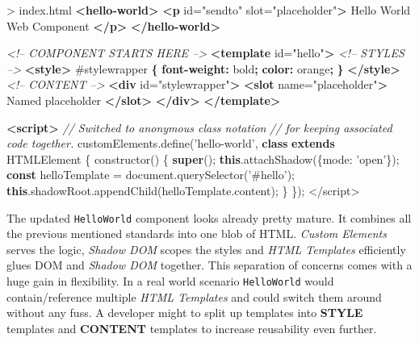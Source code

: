 \documentclass[]{article}
\newenvironment{Shaded}{}{}
\newcommand{\KeywordTok}[1]{\textcolor[rgb]{0.00,0.44,0.13}{\textbf{{#1}}}}
\newcommand{\DataTypeTok}[1]{\textcolor[rgb]{0.56,0.13,0.00}{{#1}}}
\newcommand{\FloatTok}[1]{\textcolor[rgb]{0.25,0.63,0.44}{{#1}}}
\newcommand{\StringTok}[1]{\textcolor[rgb]{0.25,0.44,0.63}{{#1}}}
\newcommand{\SpecialStringTok}[1]{\textcolor[rgb]{0.73,0.40,0.53}{{#1}}}
\newcommand{\CommentTok}[1]{\textcolor[rgb]{0.38,0.63,0.69}{\textit{{#1}}}}
\newcommand{\OtherTok}[1]{\textcolor[rgb]{0.00,0.44,0.13}{{#1}}}
\newcommand{\VariableTok}[1]{\textcolor[rgb]{0.10,0.09,0.49}{{#1}}}
\newcommand{\OperatorTok}[1]{\textcolor[rgb]{0.40,0.40,0.40}{{#1}}}
\newcommand{\AttributeTok}[1]{\textcolor[rgb]{0.49,0.56,0.16}{{#1}}}
\newcommand{\NormalTok}[1]{{#1}}
\begin{document}
\begin{Shaded}
\begin{Highlighting}[]
\NormalTok{> index.html}
\KeywordTok{<hello-world>}
 \KeywordTok{<p}\OtherTok{ id=}\StringTok{"sendto"}\OtherTok{ slot=}\StringTok{"placeholder"}\KeywordTok{>}
  \NormalTok{Hello World Web Component  }
 \KeywordTok{</p>}
\KeywordTok{</hello-world>}

\CommentTok{<!-- COMPONENT STARTS HERE -->}
\KeywordTok{<template}\OtherTok{ id=}\StringTok{"hello"}\KeywordTok{>}
 \CommentTok{<!-- STYLES -->}
 \KeywordTok{<style>}
  \FloatTok{#stylewrapper} \KeywordTok{\{}
   \KeywordTok{font-weight:} \DataTypeTok{bold}\KeywordTok{;}
   \KeywordTok{color:} \NormalTok{orange}\KeywordTok{;}
  \KeywordTok{\}}
 \KeywordTok{</style>}
 \CommentTok{<!-- CONTENT -->}
 \KeywordTok{<div}\OtherTok{ id=}\StringTok{"stylewrapper"}\KeywordTok{>}
  \KeywordTok{<slot}\OtherTok{ name=}\StringTok{"placeholder"}\KeywordTok{>}
   \NormalTok{Named placeholder}
  \KeywordTok{</slot>}
 \KeywordTok{</div>}
\KeywordTok{</template>}

\KeywordTok{<script>}
 \CommentTok{// Switched to anonymous class notation}
 \CommentTok{// for keeping associated code together.}
 \VariableTok{customElements}\NormalTok{.}\AttributeTok{define}\NormalTok{(}\StringTok{'hello-world'}\OperatorTok{,}
  \KeywordTok{class} \KeywordTok{extends} \NormalTok{HTMLElement }\OperatorTok{\{}
   \AttributeTok{constructor}\NormalTok{() }\OperatorTok{\{}
    \KeywordTok{super}\NormalTok{()}\OperatorTok{;}
    \KeywordTok{this}\NormalTok{.}\AttributeTok{attachShadow}\NormalTok{(}\OperatorTok{\{}\DataTypeTok{mode}\OperatorTok{:} \StringTok{'open'}\OperatorTok{\}}\NormalTok{)}\OperatorTok{;}
    \KeywordTok{const} \NormalTok{helloTemplate }\OperatorTok{=} \VariableTok{document}\NormalTok{.}\AttributeTok{querySelector}\NormalTok{(}\StringTok{'#hello'}\NormalTok{)}\OperatorTok{;}
    \KeywordTok{this}\NormalTok{.}\VariableTok{shadowRoot}\NormalTok{.}\AttributeTok{appendChild}\NormalTok{(}\VariableTok{helloTemplate}\NormalTok{.}\AttributeTok{content}\NormalTok{)}\OperatorTok{;}
   \OperatorTok{\}}
  \OperatorTok{\}}\NormalTok{)}\OperatorTok{;}
\OperatorTok{<}\SpecialStringTok{/script>}
\end{Highlighting}
\end{Shaded}

The updated \texttt{HelloWorld} component looks already pretty mature.
It combines all the previous mentioned standards into one blob of HTML.
\emph{Custom Elements} serves the logic, \emph{Shadow DOM} scopes the
styles and \emph{HTML Templates} efficiently glues DOM and \emph{Shadow
DOM} together. This separation of concerns comes with a huge gain in
flexibility. In a real world scenario \texttt{HelloWorld} would
contain/reference multiple \emph{HTML Templates} and could switch them
around without any fuss. A developer might to split up templates into
\textbf{STYLE} templates and \textbf{CONTENT} templates to increase
reusability even further.
\end{document}
